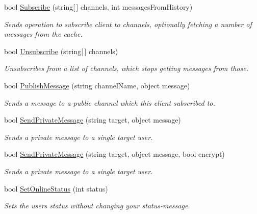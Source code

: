 \begin{DoxyCompactItemize}
bool \hyperlink{class_exit_games_1_1_client_1_1_photon_1_1_chat_1_1_chat_client_a6f6d0d0942fff96f3be1d7efbe1c00be}{Subscribe} (string\mbox{[}$\,$\mbox{]} channels, int messages\+From\+History)
\begin{DoxyCompactList}\small\item\em Sends operation to subscribe client to channels, optionally fetching a number of messages from the cache. \end{DoxyCompactList}\item 
bool \hyperlink{class_exit_games_1_1_client_1_1_photon_1_1_chat_1_1_chat_client_a5d233da812511bdf2f833461d4a501b6}{Unsubscribe} (string\mbox{[}$\,$\mbox{]} channels)
\begin{DoxyCompactList}\small\item\em Unsubscribes from a list of channels, which stops getting messages from those. \end{DoxyCompactList}\item 
bool \hyperlink{class_exit_games_1_1_client_1_1_photon_1_1_chat_1_1_chat_client_a0a8f7a1907bebc71607c3adedf11b9fd}{Publish\+Message} (string channel\+Name, object message)
\begin{DoxyCompactList}\small\item\em Sends a message to a public channel which this client subscribed to. \end{DoxyCompactList}\item 
bool \hyperlink{class_exit_games_1_1_client_1_1_photon_1_1_chat_1_1_chat_client_a423b766a0d908278cdced1e149d197b4}{Send\+Private\+Message} (string target, object message)
\begin{DoxyCompactList}\small\item\em Sends a private message to a single target user. \end{DoxyCompactList}\item 
bool \hyperlink{class_exit_games_1_1_client_1_1_photon_1_1_chat_1_1_chat_client_af671de33e90172784c8b0392571a1d72}{Send\+Private\+Message} (string target, object message, bool encrypt)
\begin{DoxyCompactList}\small\item\em Sends a private message to a single target user. \end{DoxyCompactList}\item 
bool \hyperlink{class_exit_games_1_1_client_1_1_photon_1_1_chat_1_1_chat_client_af3dade275735d7490a9872e965e6830f}{Set\+Online\+Status} (int status)
\begin{DoxyCompactList}\small\item\em Sets the user\textquotesingle{}s status without changing your status-\/message. \end{DoxyCompactList}\item 

\end{DoxyCompactItemize}
